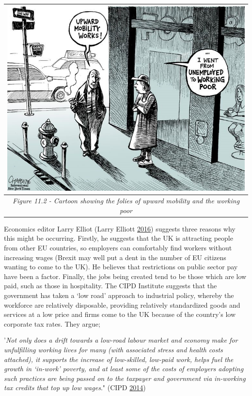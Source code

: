 \documentclass[]{tufte-handout}
\begin{document}
\begin{longtable}[]{@{}c@{}}
\toprule
\begin{minipage}[b]{0.97\columnwidth}\centering
\includegraphics{ChapterPictures/11-2-UpwardMobility.jpg}\strut
\end{minipage}\tabularnewline
\midrule
\endhead
\begin{minipage}[t]{0.97\columnwidth}\centering
\emph{Figure 11.2 - Cartoon showing the folies of upward mobility and
the working poor}\strut
\end{minipage}\tabularnewline
\bottomrule
\end{longtable}

Economics editor Larry Elliot (Larry Elliott
\protect\hyperlink{ref-LarryElliott2016}{2016}) suggests three reasons
why this might be occurring. Firstly, he suggests that the UK is
attracting people from other EU countries, so employers can comfortably
find workers without increasing wages (Brexit may well put a dent in the
number of EU citizens wanting to come to the UK). He believes that
restrictions on public sector pay have been a factor. Finally, the jobs
being created tend to be those which are low paid, such as those in
hospitality. The CIPD Institute suggests that the government has taken a
`low road' approach to industrial policy, whereby the workforce are
relatively disposable, providing relatively standardized goods and
services at a low price and firms come to the UK because of the
country's low corporate tax rates. They argue;

'\emph{Not only does a drift towards a low-road labour market and
economy make for unfulfilling working lives for many (with associated
stress and health costs attached), it supports the increase of
low-skilled, low-paid work, helps fuel the growth in `in-work' poverty,
and at least some of the costs of employers adopting such practices are
being passed on to the taxpayer and government via in-working tax
credits that top up low wages}." (CIPD
\protect\hyperlink{ref-CIPD2014}{2014})
\end{document}
